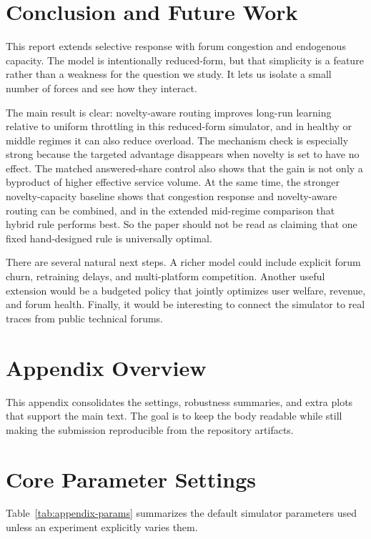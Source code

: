 \documentclass{article}
\begin{document}
\section{Conclusion and Future Work}
This report extends selective response with forum congestion and endogenous capacity. The model is intentionally reduced-form, but that simplicity is a feature rather than a weakness for the question we study. It lets us isolate a small number of forces and see how they interact.

The main result is clear: novelty-aware routing improves long-run learning relative to uniform throttling in this reduced-form simulator, and in healthy or middle regimes it can also reduce overload. The mechanism check is especially strong because the targeted advantage disappears when novelty is set to have no effect. The matched answered-share control also shows that the gain is not only a byproduct of higher effective service volume. At the same time, the stronger novelty-capacity baseline shows that congestion response and novelty-aware routing can be combined, and in the extended mid-regime comparison that hybrid rule performs best. So the paper should not be read as claiming that one fixed hand-designed rule is universally optimal.

There are several natural next steps. A richer model could include explicit forum churn, retraining delays, and multi-platform competition. Another useful extension would be a budgeted policy that jointly optimizes user welfare, revenue, and forum health. Finally, it would be interesting to connect the simulator to real traces from public technical forums.

\appendix

\section{Appendix Overview}
This appendix consolidates the settings, robustness summaries, and extra plots that support the main text. The goal is to keep the body readable while still making the submission reproducible from the repository artifacts.

\section{Core Parameter Settings}
Table~\ref{tab:appendix-params} summarizes the default simulator parameters used unless an experiment explicitly varies them.
\end{document}

